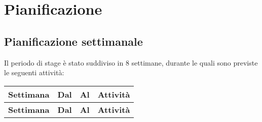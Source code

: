 \section{Pianificazione}
\subsection{Pianificazione settimanale}
Il periodo di stage è stato suddiviso in 8 settimane, durante le quali sono
previste le seguenti attività:
\begin{longtable}{|c|c|c|p{8cm}|}
    \hline
    \textbf{Settimana} & \textbf{Dal} & \textbf{Al} & \textbf{Attività}                                          \\
    \hline
    \endfirsthead

    \hline
    \textbf{Settimana} & \textbf{Dal} & \textbf{Al} & \textbf{Attività}                                          \\
    \hline
    \endhead


\end{longtable}
